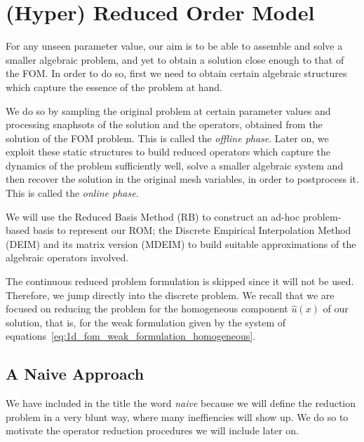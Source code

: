 \documentclass[../../thesis.tex]{subfiles}
\begin{document}
\section{(Hyper) Reduced Order Model}
\label{sec:rom_definition}
For any unseen parameter value, our aim is to be able to assemble and solve a smaller algebraic problem, 
and yet to obtain a solution close enough to that of the FOM.
In order to do so, first we need to obtain certain algebraic structures which capture the essence of the problem at hand.

We do so by sampling the original problem at certain parameter values and processing snaphsots of the solution and the operators, obtained from the solution of the FOM problem.
This is called the \emph{offline phase}.
Later on, we exploit these static structures to build reduced operators which capture the dynamics of the problem sufficiently well, solve a smaller algebraic system and then recover the solution in the original mesh variables, in order to postprocess it.
This is called the \emph{online phase}.


We will use the Reduced Basis Method (RB) to construct an ad-hoc problem-based basis to represent our ROM;
the Discrete Empirical Interpolation Method (DEIM) and its matrix version (MDEIM) 
to build suitable approximations of the algebraic operators involved. 

The continuous reduced problem formulation is skipped since it will not be used. 
Therefore, we jump directly into the discrete problem.
We recall that we are focused on reducing the problem for 
the homogeneous component $\hat{u}(x)$ of our solution, 
that is, for the weak formulation given by 
the system of equations~\eqref{eq:1d_fom_weak_formulation_homogeneous}.  

\subsection{A Naive Approach}
We have included in the title the word \emph{naive} 
because we will define the reduction problem in a very blunt way,
where many ineffiencies will show up.
We do so to motivate the operator reduction procedures we will include later on.
\end{document}
